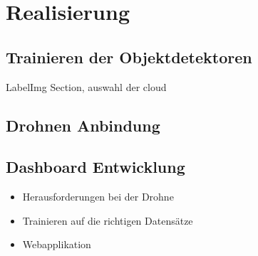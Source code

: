 \chapter{Realisierung}

\section{Trainieren der Objektdetektoren}

LabelImg Section, auswahl der cloud

\section{Drohnen Anbindung}

\section{Dashboard Entwicklung}

\begin{itemize}
	\item Herausforderungen bei der Drohne
	\item Trainieren auf die richtigen Datensätze
	\item Webapplikation
\end{itemize}